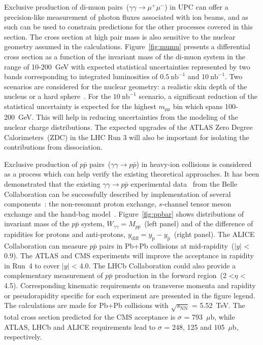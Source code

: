 Exclusive production of di-muon pairs~($\gamma\gamma\rightarrow \mu^+\mu^-$) in UPC can offer a precision-like measurement of photon fluxes associated with ion beams, and as such can be used to constrain predictions for the other processes covered in this section. The cross section at high pair mass is also sensitive to the nuclear geometry assumed in the calculations. Figure~\ref{fig:mumu} presents a differential cross section as a function of the invariant mass of the di-muon system in the range of 10-200~GeV with expected statistical uncertainties represented by two bands corresponding to integrated luminosities of $0.5~\mathrm{nb}^{-1}$ and
$10~\mathrm{nb}^{-1}$. Two scenarios are considered for the nuclear
geometry: a realistic skin depth of the nucleus or a hard sphere~\cite{Barrett:1977}.
For the $10~\mathrm{nb}^{-1}$ scenario, a significant reduction of the
statistical uncertainty is expected for the highest $m_\mathrm{\mu\mu}$ bin which spans 100-200~GeV.  This will help in reducing uncertainties from the modeling of the nuclear charge distributions.
The expected upgrades of the ATLAS Zero Degree Calorimeters~(ZDC) in the LHC Run 3 will also be important for isolating the contributions from dissociation.

Exclusive production of $p\bar{p}$ pairs~($\gamma\gamma\rightarrow p\bar{p}$) in heavy-ion collisions is considered as a process which can help verify the existing theoretical approaches. It has been demonstrated that the existing $\gamma\gamma\rightarrow p\bar{p}$ experimental data~\cite{Kuo:2005nr} from the Belle Collaboration can be successfully described by implementation of several components~\cite{Klusek-Gawenda:2017lgt}: the non-resonant proton exchange, $s$-channel tensor meson exchange and the hand-bag model~\cite{Diehl:2002yh}. Figure~\ref{fig:ppbar} shows distributions of invariant mass of the $p\bar{p}$ system, $W_{\gamma\gamma} = M_{p\bar{p}}$~(left panel) and of the difference
of rapidities for protons and anti-protons, $y_{\mathrm{diff}} = y_\mathrm{p} - y_{\mathrm{\bar{p}}}$~(right panel).
The ALICE Collaboration can measure $p\bar{p}$ pairs in Pb+Pb collisions at mid-rapidity~($|y|$ < 0.9). The ATLAS and CMS experiments will improve the acceptance in rapidity in Run~4 to cover $|y|$ < 4.0.
The LHCb Collaboration could also provide a complementary measurement of $p\bar{p}$ production in the forward region~(2 <$\eta$ < 4.5).  Corresponding kinematic requirements on transverse momenta and rapidity or pseudorapidity specific for each experiment are presented in the figure legend. The calculations are made for Pb+Pb collisions with $\sqrt{s_{\mathrm{NN}}}$ = 5.52~TeV.
The total cross section predicted for the CMS acceptance is $\sigma$ = 793~$\mu$b, while ATLAS, LHCb and ALICE requirements lead to $\sigma$ = 248, 125 and 105~$\mu$b, respectively.

